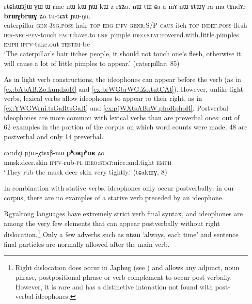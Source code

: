 \documentclass[oldfontcommands,oneside,a4paper,11pt]{article}
\newcommand{\ipa}[1]{{\phon \mbox{#1}}} %
\begin{document}
\begin{exe}
\ex \label{ex:brWGbrWG.Zo.tutCAt}
\gll
\ipa{rtɕhɯʁjɯ}  	\ipa{ɣɯ}  	\ipa{ɯ-rme}  	\ipa{nɯ}  	\ipa{kɯ}  	\ipa{ɲɯ-kɯ-z-rɤʑa.}  	\ipa{nɯ}  	\ipa{tɯ-ɕa}  	\ipa{a-mɤ-nɯ-ɤtɯɣ}  	\ipa{ra}  	\ipa{ma}  	\ipa{tɤndɤr}  	\ipa{\textbf{brɯɣbrɯɣ}}  	\ipa{ʑo}  	\ipa{tu-tɕɤt}  	\ipa{ɲɯ-ŋu.}  \\
caterpillar \textsc{gen} \textsc{3sg.poss}-hair \textsc{top} \textsc{erg} \textsc{ipfv-genr:S/P-caus}-itch \textsc{top} \textsc{indef.poss}-flesh \textsc{irr-neg-pfv}-touch \textsc{fact}:have.to \textsc{lnk} pimple \textsc{ideo:stat}:covered.with.little.pimples \textsc{emph} \textsc{ipfv}-take.out \textsc{testim}-be \\
\glt `The caterpillar's hair itches people, it should not touch one's flesh, otherwise it will cause a lot of little pimples to appear.' (caterpillar, 85)
\end{exe}

As in light verb constructions, the ideophones can appear  before the verb (as in \ref{ex:bAbAB.Zo.kundzoR} and \ref{ex:brWGbrWG.Zo.tutCAt}). However, unlike light verbs, lexical verbs allow ideophones to appear to their right, as in \ref{ex:YWGWrni.tsGaRtsGaR} and \ref{ex:pjWXtsABnW.phoRphoR}. Postverbal ideophones are more common with lexical verbs than are preverbal ones: out of 62 examples in the portion of the corpus on which word counts were made, 48 are postverbal and only 14 preverbal. 




 \begin{exe}
\ex \label{ex:pjWXtsABnW.phoRphoR}
\gll 
\ipa{cɤndʐi}  	\ipa{pjɯ-χtsɤβ-nɯ}  	\ipa{\textbf{pʰoʁpʰoʁ}} \ipa{ʑo}\\
musk.deer.skin \textsc{ipfv}-rub-\textsc{pl} \textsc{ideo:stat}:nice.and.tight \textsc{emph}\\
\glt `They rub the musk deer skin very tightly.' (tɕakɯɣ, 8)
\end{exe}

In combination with stative verbs, ideophones only occur postverbally: in our corpus, there are no examples of a stative verb preceded by an ideophone. 

Rgyalrong languages have extremely strict verb final syntax, and ideophones are among the very few elements that can appear  postverbally without right dislocation.\footnote{Right dislocation does occur in Japhug (see \citealt[207-8]{jacques13harmonization}) and allows any adjunct, noun phrase, postpositional phrase or verb complement to occur post-verbally. However, it is rare and has a distinctive intonation not found with post-verbal ideophones.} Only a few adverbs such as \ipa{ntsɯ} `always, each time' and sentence final particles are normally allowed after the main verb. 
\end{document}
